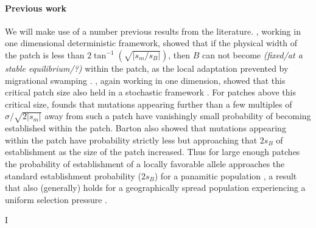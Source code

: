 \documentclass{article}
\newcommand{\gc}[1]{{ \it \color{green} (#1) } }
\begin{document}
\paragraph{Previous work} We will make use of a number previous
results from the literature. \citet{slatkin1973geneflow}, working in
one dimensional deterministic framework, showed that if the
physical width of the patch is less than $2 \tan^{-1}
(\sqrt{|s_m/s_B|})$, then $B$ can not 
become \gc{fixed/at a stable equilibrium/?} within the patch, as the local adaptation prevented by
migrational swamping \citep[see also][ for a review]{Lenormand}.
 \citet{barton1987establishment}, again working in one dimension,
 showed that this critical patch size also held in a stochastic
 framework \citep[see also the work of][]{Polk}. 
For patches above this critical size, \citet{barton1987establishment}
 founds that mutations appearing further than a few multiples of
 $\sigma/\sqrt{2|s_m|}$ away from such a patch have vanishingly small
 probability of becoming established within the patch. 
Barton also showed that mutations appearing within the patch have probability 
strictly less but approaching that $2s_B$ of establishment as the size
of the patch increased. Thus for large enough patches the probability
of establishment of a locally favorable allele approaches the standard
establishment probability ($2s_B$) for a panamitic population
\citep[][]{haldane, fisher}, a result that also (generally) holds for
a geographically spread population experiencing a uniform selection
pressure \citep{Maruyama, cherry}. 




I%
\end{document}
